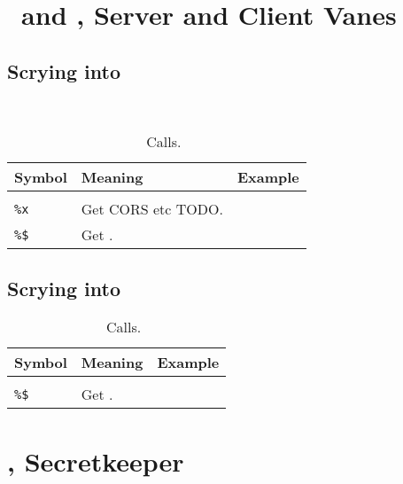 \section[\eyre~\&~\iris]{\eyre~and \iris, Server and Client Vanes}

\subsection{Scrying into \eyre}

\eyre~

\begin{table}[h!]
  \begin{center}
    \caption{\jael~\dotket~Calls.}
    \label{ha:iris}
    \begin{tabular}{lll}
      Symbol & Meaning & Example \\
      \hline \\
      \texttt{\%x} & Get CORS etc TODO. & \\
      \texttt{\%\$} & Get . & \\  %
    \end{tabular}
  \end{center}
\end{table}

\subsection{Scrying into \iris}

\begin{table}[h!]
  \begin{center}
    \caption{\iris~\dotket~Calls.}
    \label{ha:iris}
    \begin{tabular}{lll}
      Symbol & Meaning & Example \\
      \hline \\
      \texttt{\%\$} & Get . & \\  %
    \end{tabular}
  \end{center}
\end{table}

\section[\jael]{\jael, Secretkeeper}


